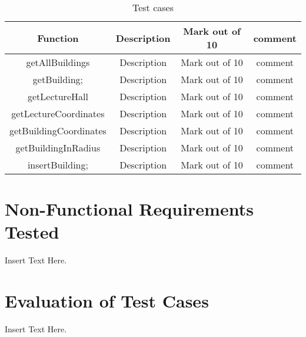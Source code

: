 \documentclass[12pt]{article}
\begin{document}
		
		\begin{table}[h!]
		
			\centering
			\caption{Test cases }
			\label{tab:table1}
			\vline
			\begin{tabular}{cccc}
				
				\hline
				\hline
				Function  & Description & Mark out of 10  & comment\\
				\hline
				\hline
				getAllBuildings  & Description & Mark out of 10 & comment\\
				\hline
				getBuilding; & Description & Mark out of 10 & comment\\
				\hline
				getLectureHall & Description & Mark out of 10 & comment\\
				\hline
				getLectureCoordinates & Description & Mark out of 10 & comment\\
				\hline
				getBuildingCoordinates & Description & Mark out of 10 & comment\\
				\hline
				getBuildingInRadius & Description & Mark out of 10 & comment\\
				\hline
				insertBuilding; & Description & Mark out of 10 & comment\\
				\hline
			\end{tabular}	\vline
	
		\end{table}
	
		



\section{Non-Functional Requirements Tested}
Insert Text Here.

\section{Evaluation of Test Cases}
Insert Text Here.
\end{document}

